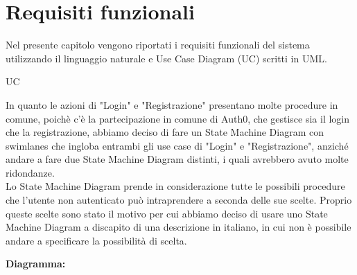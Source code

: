 \section{Requisiti funzionali}
\label{secD2:RequisitiFunzionali}

Nel presente capitolo vengono riportati i requisiti funzionali del sistema utilizzando il linguaggio naturale e Use Case Diagram (UC) scritti in UML.

\begin{listaPersonale}{UC}

    \begin{center}
        
    \end{center}
    In quanto le azioni di "Login" e "Registrazione" presentano molte procedure in comune, poichè c'è la partecipazione in comune di Auth0, che gestisce sia il login che la registrazione, abbiamo deciso di fare un State Machine Diagram con swimlanes che ingloba entrambi gli use case di "Login" e "Registrazione", anziché andare a fare due State Machine Diagram distinti, i quali avrebbero avuto molte ridondanze. \\ Lo State Machine Diagram prende in considerazione tutte le possibili procedure che l'utente non autenticato  può intraprendere a seconda delle sue scelte. Proprio queste scelte sono stato il motivo per cui abbiamo deciso di usare uno State Machine Diagram a discapito di una descrizione in italiano, in cui non è possibile andare a specificare la possibilità di scelta.

    \textbf{Diagramma:}
    \begin{center}
        
    \end{center}



\end{listaPersonale}
